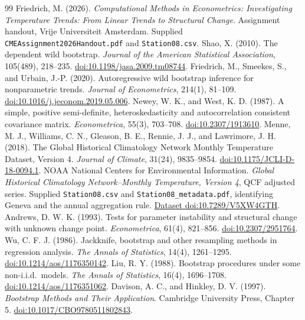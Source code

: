 \documentclass[11pt,a4paper]{article}
\begin{document}
\clearpage
{}
{}
\begin{thebibliography}{99}
 Friedrich, M. (2026). \emph{Computational Methods in Econometrics: Investigating Temperature Trends: From Linear Trends to Structural Change}. Assignment handout, Vrije Universiteit Amsterdam. Supplied \texttt{CMEAssignment2026Handout.pdf} and \texttt{Station08.csv}.
 Shao, X. (2010). The dependent wild bootstrap. \emph{Journal of the American Statistical Association}, 105(489), 218--235. \href{https://doi.org/10.1198/jasa.2009.tm08744}{doi:10.1198/jasa.2009.tm08744}.
 Friedrich, M., Smeekes, S., and Urbain, J.-P. (2020). Autoregressive wild bootstrap inference for nonparametric trends. \emph{Journal of Econometrics}, 214(1), 81--109. \href{https://doi.org/10.1016/j.jeconom.2019.05.006}{doi:10.1016/j.jeconom.2019.05.006}.
 Newey, W. K., and West, K. D. (1987). A simple, positive semi-definite, heteroskedasticity and autocorrelation consistent covariance matrix. \emph{Econometrica}, 55(3), 703--708. \href{https://doi.org/10.2307/1913610}{doi:10.2307/1913610}.
 Menne, M. J., Williams, C. N., Gleason, B. E., Rennie, J. J., and Lawrimore, J. H. (2018). The Global Historical Climatology Network Monthly Temperature Dataset, Version 4. \emph{Journal of Climate}, 31(24), 9835--9854. \href{https://doi.org/10.1175/JCLI-D-18-0094.1}{doi:10.1175/JCLI-D-18-0094.1}.
 NOAA National Centers for Environmental Information. \emph{Global Historical Climatology Network--Monthly Temperature, Version 4}, QCF adjusted series. Supplied \texttt{Station08.csv} and \texttt{Station08\_metadata.pdf}, identifying Geneva and the annual aggregation rule. \href{https://doi.org/10.7289/V5XW4GTH}{Dataset doi:10.7289/V5XW4GTH}.
 Andrews, D. W. K. (1993). Tests for parameter instability and structural change with unknown change point. \emph{Econometrica}, 61(4), 821--856. \href{https://doi.org/10.2307/2951764}{doi:10.2307/2951764}.
 Wu, C. F. J. (1986). Jackknife, bootstrap and other resampling methods in regression analysis. \emph{The Annals of Statistics}, 14(4), 1261--1295. \href{https://doi.org/10.1214/aos/1176350142}{doi:10.1214/aos/1176350142}.
 Liu, R. Y. (1988). Bootstrap procedures under some non-i.i.d.\ models. \emph{The Annals of Statistics}, 16(4), 1696--1708. \href{https://doi.org/10.1214/aos/1176351062}{doi:10.1214/aos/1176351062}.
 Davison, A. C., and Hinkley, D. V. (1997). \emph{Bootstrap Methods and Their Application}. Cambridge University Press, Chapter 5. \href{https://doi.org/10.1017/CBO9780511802843}{doi:10.1017/CBO9780511802843}.

\end{thebibliography}
\end{document}
